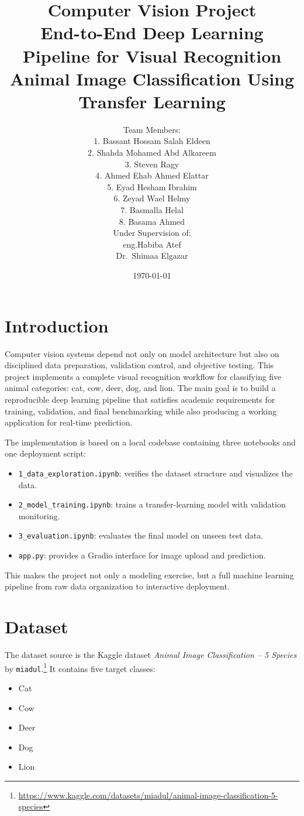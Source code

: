\documentclass[12pt,a4paper]{article}
\title{\textbf{Computer Vision Project}\\[0.5em]
\Large End-to-End Deep Learning Pipeline for Visual Recognition\\[0.3em]
\large Animal Image Classification Using Transfer Learning}
\author{
Team Members:\\[0.3em]
1. Bassant Hossam Salah Eldeen\\
2. Shahda Mohamed Abd Alkareem\\
3. Steven Ragy\\
4. Ahmed Ehab Ahmed Elattar\\
5. Eyad Hesham Ibrahim\\
6. Zeyad Wael Helmy\\
7. Basmalla Helal\\
8. Basama Ahmed\\[1em]
Under Supervision of:\\[0.3em]
eng.Habiba Atef\\
Dr.\ Shimaa Elgazar
}
\date{\today}
\begin{document}
\maketitle

\section{Introduction}
Computer vision systems depend not only on model architecture but also on disciplined data preparation, validation control, and objective testing. This project implements a complete visual recognition workflow for classifying five animal categories: cat, cow, deer, dog, and lion. The main goal is to build a reproducible deep learning pipeline that satisfies academic requirements for training, validation, and final benchmarking while also producing a working application for real-time prediction.

The implementation is based on a local codebase containing three notebooks and one deployment script:
\begin{itemize}
    \item \texttt{1\_data\_exploration.ipynb}: verifies the dataset structure and visualizes the data.
    \item \texttt{2\_model\_training.ipynb}: trains a transfer-learning model with validation monitoring.
    \item \texttt{3\_evaluation.ipynb}: evaluates the final model on unseen test data.
    \item \texttt{app.py}: provides a Gradio interface for image upload and prediction.
\end{itemize}

This makes the project not only a modeling exercise, but a full machine learning pipeline from raw data organization to interactive deployment.

\section{Dataset}
The dataset source is the Kaggle dataset \emph{Animal Image Classification -- 5 Species} by \texttt{miadul}.\footnote{\url{https://www.kaggle.com/datasets/miadul/animal-image-classification-5-species}} It contains five target classes:
\begin{itemize}
    \item Cat
    \item Cow
    \item Deer
    \item Dog
    \item Lion
\end{itemize}
\end{document}
